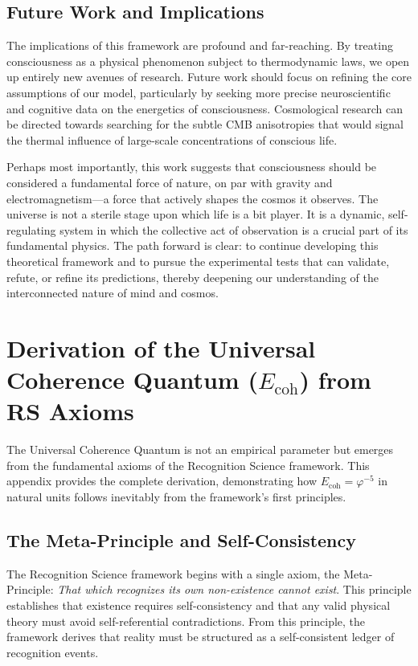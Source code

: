 \documentclass[11pt,a4paper]{article}
\theoremstyle{definition}
\theoremstyle{remark}
\begin{document}
\subsection{Future Work and Implications}
The implications of this framework are profound and far-reaching. By treating consciousness as a physical phenomenon subject to thermodynamic laws, we open up entirely new avenues of research. Future work should focus on refining the core assumptions of our model, particularly by seeking more precise neuroscientific and cognitive data on the energetics of consciousness. Cosmological research can be directed towards searching for the subtle CMB anisotropies that would signal the thermal influence of large-scale concentrations of conscious life.

Perhaps most importantly, this work suggests that consciousness should be considered a fundamental force of nature, on par with gravity and electromagnetism—a force that actively shapes the cosmos it observes. The universe is not a sterile stage upon which life is a bit player. It is a dynamic, self-regulating system in which the collective act of observation is a crucial part of its fundamental physics. The path forward is clear: to continue developing this theoretical framework and to pursue the experimental tests that can validate, refute, or refine its predictions, thereby deepening our understanding of the interconnected nature of mind and cosmos.

\appendix

\section{Derivation of the Universal Coherence Quantum (\(E_{\text{coh}}\)) from RS Axioms}

The Universal Coherence Quantum is not an empirical parameter but emerges from the fundamental axioms of the Recognition Science framework. This appendix provides the complete derivation, demonstrating how \(E_{\text{coh}} = \varphi^{-5}\) in natural units follows inevitably from the framework's first principles.

\subsection{The Meta-Principle and Self-Consistency}

The Recognition Science framework begins with a single axiom, the Meta-Principle: \textit{That which recognizes its own non-existence cannot exist}. This principle establishes that existence requires self-consistency and that any valid physical theory must avoid self-referential contradictions. From this principle, the framework derives that reality must be structured as a self-consistent ledger of recognition events.
\end{document}
